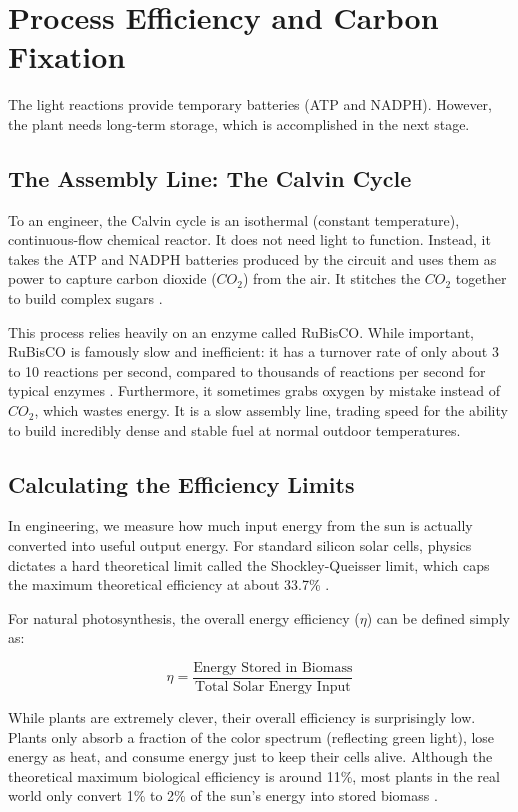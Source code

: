 \documentclass[conference]{IEEEtran}
\begin{document}
\section{Process Efficiency and Carbon Fixation}
The light reactions provide temporary batteries (ATP and NADPH). However, the plant needs long-term storage, which is accomplished in the next stage.

\subsection{The Assembly Line: The Calvin Cycle}
To an engineer, the Calvin cycle is an isothermal (constant temperature), continuous-flow chemical reactor. It does not need light to function. Instead, it takes the ATP and NADPH batteries produced by the circuit and uses them as power to capture carbon dioxide ($CO_2$) from the air. It stitches the $CO_2$ together to build complex sugars \cite{bensonFollowingPathCarbon2002}. 

This process relies heavily on an enzyme called RuBisCO. While important, RuBisCO is famously slow and inefficient: it has a turnover rate of only about 3 to 10 reactions per second, compared to thousands of reactions per second for typical enzymes \cite{anderssonCatalysisRegulationRubisco2008}. Furthermore, it sometimes grabs oxygen by mistake instead of $CO_2$, which wastes energy. It is a slow assembly line, trading speed for the ability to build incredibly dense and stable fuel at normal outdoor temperatures.

\subsection{Calculating the Efficiency Limits}
In engineering, we measure how much input energy from the sun is actually converted into useful output energy. For standard silicon solar cells, physics dictates a hard theoretical limit called the Shockley-Queisser limit, which caps the maximum theoretical efficiency at about 33.7\% \cite{ruhleTabulatedValuesShockley2016}.

For natural photosynthesis, the overall energy efficiency ($\eta$) can be defined simply as:

\begin{equation}
\eta = \frac{\text{Energy Stored in Biomass}}{\text{Total Solar Energy Input}}
\label{eq:efficiency}
\end{equation}

While plants are extremely clever, their overall efficiency is surprisingly low. Plants only absorb a fraction of the color spectrum (reflecting green light), lose energy as heat, and consume energy just to keep their cells alive. Although the theoretical maximum biological efficiency is around 11\%, most plants in the real world only convert 1\% to 2\% of the sun's energy into stored biomass \cite{zhuImprovingPhotosyntheticEfficiency2010}.
\end{document}
